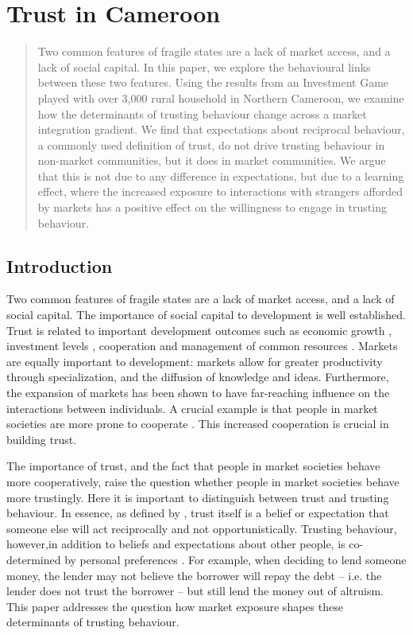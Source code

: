 \chapter{Trust in Cameroon}
\begin{abstract}
Two common features of fragile states are a lack of market access, and a lack of social capital. In this paper, we explore the behavioural links between these two features. Using the results from an Investment Game played with over 3,000 rural household in Northern Cameroon, we examine how the determinants of trusting behaviour change across a market integration gradient. We find that expectations about reciprocal behaviour, a commonly used definition of trust, do not drive trusting behaviour in non-market communities, but it does in market communities. We argue that this is not due to any difference in expectations, but due to a learning effect, where the increased exposure to interactions with strangers afforded by markets has a positive effect on the willingness to engage in trusting behaviour.
\end{abstract}


\section{Introduction}

Two common features of fragile states are a lack of market access, and a lack of social capital. The importance of social capital to development is well established. Trust is related to important development outcomes such as economic growth \citep{Knack1997}, investment levels \citep{Zak2001}, cooperation \citep{Gachter2004,Sonderskov2011} and management of common resources \citep{Bouma2008}. Markets are equally important to development: markets allow for greater productivity through specialization, and the diffusion of knowledge and ideas. Furthermore, the expansion of markets has been shown to have far-reaching influence on the interactions between individuals. A crucial example is that people in market societies are more prone to cooperate \citep{Henrich2010}. This increased cooperation is crucial in building trust.

The importance of trust, and the fact that people in market societies behave more cooperatively, raise the question whether people in market societies behave more trustingly. Here it is important to distinguish between trust and trusting behaviour. In essence, as defined by \cite{Gambetta2000}, trust itself is a belief or expectation that someone else will act reciprocally and not opportunistically. Trusting behaviour, however,in addition to beliefs and expectations about other people, is co-determined by personal preferences \citep{Sapienza2013}. For example, when deciding to lend someone money, the lender may not believe the borrower will repay the debt -- i.e. the lender does not trust the borrower -- but still lend the money out of altruism. This paper addresses the question how market exposure shapes these determinants of trusting behaviour.

